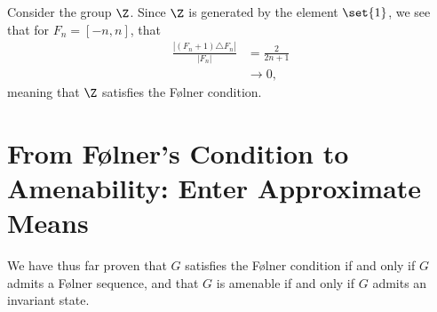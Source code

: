 \begin{example}
  Consider the group $\Z$. Since $\Z$ is generated by the element $\set{1}$, we see that for $F_n = [-n,n]$, that
  \begin{align*}
    \frac{\left\vert \left(F_n + 1\right)\triangle F_n \right\vert}{\left\vert F_n \right\vert} &= \frac{2}{2n+1}\\
                                                                                                &\rightarrow 0,
  \end{align*}
  meaning that $\Z$ satisfies the Følner condition.
\end{example}
\section{From Følner's Condition to Amenability: Enter Approximate Means}%
We have thus far proven that $G$ satisfies the Følner condition if and only if $G$ admits a Følner sequence, and that $G$ is amenable if and only if $G$ admits an invariant state.\newline

